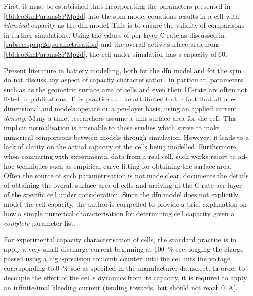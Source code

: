 First,  it  must be  established  that  incorporating the  parameters  presented
in \cref{tbl:lcoSimParamsSPMp2d} into the \gls{spm} model equations results in a
cell with  \emph{identical} capacity as the  \gls{dfn} model. This is  to ensure
the  validity  of  comparisons  in  further simulations.  Using  the  values  of
per-layer  C-rate as  discussed  in \cref{subsec:spmp2dparametrisation} and  the
overall active  surface area from \cref{tbl:lcoSimParamsSPMp2d}, the  cell under
simulation has a capacity of \SI{60}{\amphour}.

Present literature  in battery modelling, both  for the \gls{dfn} model  and for
the  \gls{spm}  do not  discuss  any  aspect  of capacity  characterisation.  In
particular,  parameters such  as  as the  geometric surface  area  of cells  and
even  their 1C-rate  are often  not listed  in publications.  This practice  can
be  attributed  to  the  fact  that  all  one-dimensional  and  
models operate  on a per-layer  basis, using an applied  current \emph{density}.
Many  a  time,  researchers assume  a  unit  surface  area  for the  cell.  This
implicit  normalisation  is amenable  to  those  studies  which strive  to  make
numerical comparisons  between models through  simulation. However, it  leads to
a  lack  of  clarity  on  the  actual capacity  of  the  cells  being  modelled.
Furthermore, when comparing with experimental data  from a real cell, such works
resort to  ad-hoc techniques such  as empirical curve-fitting for  obtaining the
surface  area. Often  the  source of  such parametrisation  is  not made  clear.
  documents  the  details of  obtaining  the  overall
surface area of cells and arriving at  the C-rate per layer of the specific cell
under consideration.  Since the  \gls{dfn} model does  not explicitly  model the
cell capacity,  the author is  compelled to provide  a brief explanation  on how
a  simple  numerical characterisation  for  determining  cell capacity  given  a
\emph{complete} parameter list.


For experimental capacity characterisation of cells, the standard practice is to
apply a very small discharge  current beginning at \SI{100}{\percent} \gls{soc},
logging the charge passed using a  high-precision coulomb counter until the cell
hits the voltage corresponding to \SI{0}{\percent} \gls{soc} as specified in the
manufacturer datasheet. In  order to decouple the effect of  the cell's dynamics
from its  capacity, it is  required to  apply an infinitesimal  bleeding current
(tending towards, but should not reach \SI{0}{\ampere}).

